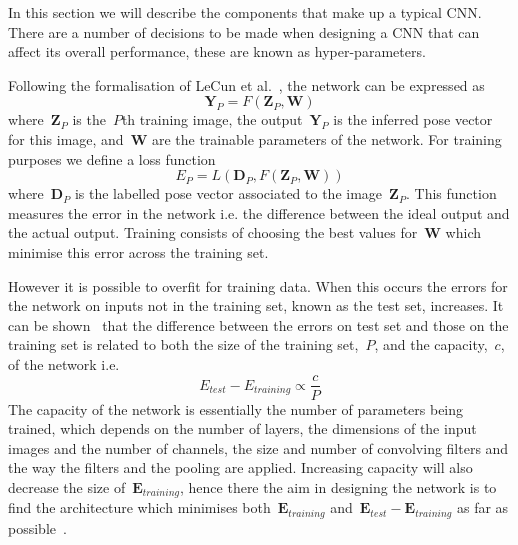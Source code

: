 \documentclass[11pt]{article} %
\begin{document}
In this section we will describe the components that make up a typical CNN. There are a number of decisions to be made when designing a CNN that can affect its overall performance, these are known as hyper-parameters.

Following the formalisation of LeCun et al.~\cite{LeCun1998}, the network can be expressed as 
\begin{equation}
\boldsymbol{Y}_P = F(\boldsymbol{Z}_P,\boldsymbol{W})
\end{equation}
where~$\boldsymbol{Z}_{P}$ is the~$P$th training image, the output~$\boldsymbol{Y}_{P}$ is the inferred pose vector for this image, and~$\boldsymbol{W}$ are the trainable parameters of the network. For training purposes we define a loss function 
\begin{equation}
E_P = L(\boldsymbol{D}_P, F(\boldsymbol{Z}_P,\boldsymbol{W}))
\label{eq:loss}
\end{equation}
where~$\boldsymbol{D}_P$ is the labelled pose vector associated to the image~$\boldsymbol{Z}_P$. This function measures the error in the network i.e. the difference between the ideal output and the actual output. Training consists of choosing the best values for~$\boldsymbol{W}$ which minimise this error across the training set. 

However it is possible to overfit for training data. When this occurs the errors for the network on inputs not in the training set, known as the test set, increases. It can be shown~\cite{Seung1992,Vapnik1994} that the difference between the errors on test set and those on the training set is related to both the size of the training set,~$P$, and the capacity,~$c$,  of the network i.e. 
\begin{equation}
E_{test}-E_{training} \propto \frac{c}{P}
\label{eq:errorCap}
\end{equation}
The capacity of the network is essentially the number of parameters being trained, which depends on the number of layers, the dimensions of the input images and the number of channels, the size and number of convolving filters and the way the filters and the pooling are applied. Increasing capacity will also decrease the size of~$\boldsymbol{E}_{training}$, hence there the aim in designing the network is to find the architecture which minimises both~$\boldsymbol{E}_{training}$ and~$\boldsymbol{E}_{test}-\boldsymbol{E}_{training}$ as far as possible~\cite{LeCun1998}.

\label{sec:architecture}
\end{document}
